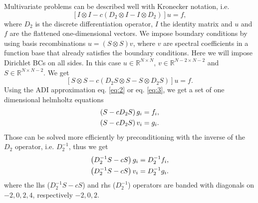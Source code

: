 \documentclass[10pt,a4paper]{article}
\begin{document}
Multivariate problems can be described well with Kronecker notation, i.e.
\begin{equation}
\left[I \otimes I - c \left(D_2 \otimes I - I \otimes D_2\right)\right] u = f,
\end{equation}
where $D_2$ is the discrete differentiation operator, $I$ the identity matrix and $u$ and $f$ are the flattened one-dimensional vectors.
We impose boundary conditions by using basis recombinations $u=(S\otimes S)v$, where $v$ are spectral coefficients in a function base that already satisfies the boundary conditions. Here we will impose Dirichlet BCs on all sides. In this case $u\in\mathbb{R}^{N\times N}$, $v\in\mathbb{R}^{N-2\times N-2}$ and $S\in\mathbb{R}^{N\times N-2}$. We get
\begin{equation}
\left[S \otimes S - c \left(D_2 S \otimes S - S \otimes D_2 S\right)\right] u = f.
\label{eq:5}
\end{equation}
Using the ADI approximation eq. \eqref{eq:2} or eq. \eqref{eq:3}, we get a set of one dimensional helmholtz equations
\begin{align}
     \left( S - c D_2 S \right) g_i &= f_i, \notag\\
     \left( S - c D_2 S \right) v_i &= g_i.
     \label{eq:6}
\end{align}
Those can be solved more efficiently by preconditioning with the inverse of the $D_2$ operator, i.e. $D_2^{-1}$, thus we get
\begin{align}
     \left( D_2^{-1}S - c S \right) g_i &= D_2^{-1}f_i, \notag\\
     \left( D_2^{-1}S - c S \right) v_i &= D_2^{-1}g_i.
     \label{eq:6}
\end{align}
where the lhs ($D_2^{-1}S - c S$) and rhs ($D_2^{-1}$) operators are banded with diagonals on $-2, 0, 2, 4$, respectively $-2, 0, 2$.
\end{document}
